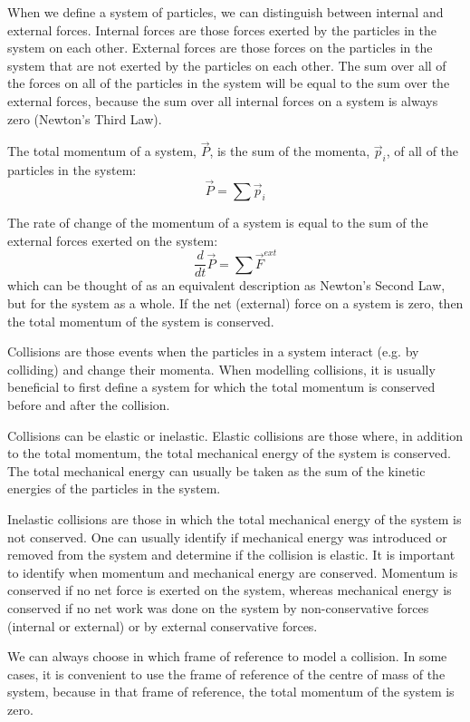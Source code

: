 When we define a system of particles, we can distinguish between internal and external forces. Internal forces are those forces exerted by the particles in the system on each other. External forces are those forces on the particles in the system that are not exerted by the particles on each other. The sum over all of the forces on all of the particles in the system will be equal to the sum over the external forces, because the sum over all internal forces on a system is always zero (Newton's Third Law).

The total momentum of a system, $\vec P$, is the sum of the momenta, $\vec p_i$, of all of the particles in the system:
\begin{equation}
\vec P = \sum \vec p_i
\end{equation}

The rate of change of the momentum of a system is equal to the sum of the external forces exerted on the system:
\begin{equation}
\frac{d}{dt}\vec P = \sum \vec F^{ext}
\end{equation}
which can be thought of as an equivalent description as Newton's Second Law, but for the system as a whole. If the net (external) force on a system is zero, then the total momentum of the system is conserved.

Collisions are those events when the particles in a system interact (e.g. by colliding) and change their momenta. When modelling collisions, it is usually beneficial to first define a system for which the total momentum is conserved before and after the collision.

Collisions can be elastic or inelastic. Elastic collisions are those where, in addition to the total momentum, the total mechanical energy of the system is conserved. The total mechanical energy can usually be taken as the sum of the kinetic energies of the particles in the system.

Inelastic collisions are those in which the total mechanical energy of the system is not conserved. One can usually identify if mechanical energy was introduced or removed from the system and determine if the collision is elastic. It is important to identify when momentum and mechanical energy are conserved. Momentum is conserved if no net force is exerted on the system, whereas mechanical energy is conserved if no net work was done on the system by non-conservative forces (internal or external) or by external conservative forces.

We can always choose in which frame of reference to model a collision. In some cases, it is convenient to use the frame of reference of the centre of mass of the system, because in that frame of reference, the total momentum of the system is zero.

